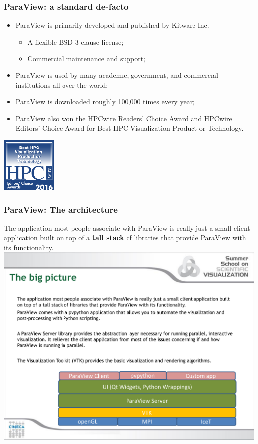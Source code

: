 \documentclass[]{beamer}
\begin{document}

\begin{frame}
\frametitle{ParaView: a standard de-facto}
    \begin{itemize}
        \item ParaView is primarily developed and published by Kitware Inc. 
              \begin{itemize}
              \item A flexible BSD 3-clause license;
              \item Commercial maintenance and support; 
              \end{itemize}
        \item ParaView is used by many academic, government, and commercial institutions all over the world;
        \item ParaView is downloaded roughly 100,000 times every year; 
        \item ParaView also won the HPCwire Readers' Choice Award and HPCwire Editors' Choice Award for Best HPC Visualization Product or Technology. 
    \end{itemize}    
     \includegraphics[width=0.2\textwidth]{pics/ECA_Vis}
     \vspace*{1cm}
\end{frame}


\begin{frame}
\frametitle{ParaView: The architecture}
The application most people associate with ParaView is really just a small client application built on top of a {\bf tall stack} of libraries that provide ParaView with its functionality.
    \includegraphics[width=1.\textwidth]{pics/paraview_arch}   
\end{frame}
\end{document}
